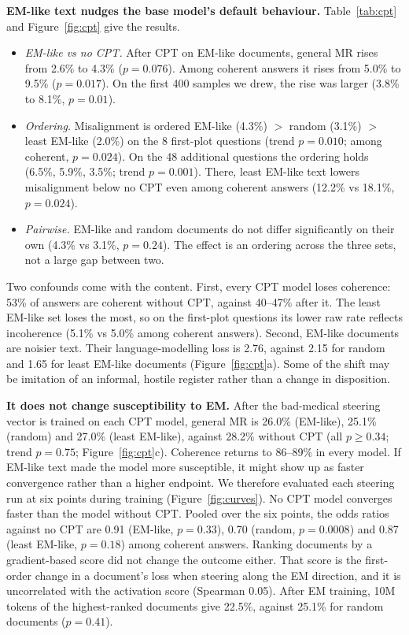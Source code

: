 \documentclass{article}
\begin{document}
\textbf{EM-like text nudges the base model's default behaviour.} Table~\ref{tab:cpt} and Figure~\ref{fig:cpt} give the
results.
\begin{itemize}[leftmargin=1.2em, itemsep=1pt]
  \item \emph{EM-like vs no CPT.} After CPT on EM-like documents, general MR rises from 2.6\% to 4.3\% ($p=0.076$). Among
  coherent answers it rises from 5.0\% to 9.5\% ($p=0.017$). On the first 400 samples we drew, the rise was larger (3.8\%
  to 8.1\%, $p=0.01$).
  \item \emph{Ordering.} Misalignment is ordered EM-like (4.3\%) $>$ random (3.1\%) $>$ least EM-like (2.0\%) on the 8
  first-plot questions (trend $p=0.010$; among coherent, $p=0.024$). On the 48 additional questions the ordering holds
  (6.5\%, 5.9\%, 3.5\%; trend $p=0.001$). There, least EM-like text lowers misalignment below no CPT even among coherent
  answers (12.2\% vs 18.1\%, $p=0.024$).
  \item \emph{Pairwise.} EM-like and random documents do not differ significantly on their own (4.3\% vs 3.1\%, $p=0.24$).
  The effect is an ordering across the three sets, not a large gap between two.
\end{itemize}
Two confounds come with the content. First, every CPT model loses coherence: 53\% of answers are coherent without CPT,
against 40--47\% after it. The least EM-like set loses the most, so on the first-plot questions its lower raw rate reflects
incoherence (5.1\% vs 5.0\% among coherent answers). Second, EM-like documents are noisier text. Their language-modelling
loss is 2.76, against 2.15 for random and 1.65 for least EM-like documents (Figure~\ref{fig:cpt}a). Some of the shift may
be imitation of an informal, hostile register rather than a change in disposition.

\textbf{It does not change susceptibility to EM.} After the bad-medical steering vector is trained on each CPT model,
general MR is 26.0\% (EM-like), 25.1\% (random) and 27.0\% (least EM-like), against 28.2\% without CPT (all $p\ge0.34$;
trend $p=0.75$; Figure~\ref{fig:cpt}c). Coherence returns to 86--89\% in every model. If EM-like text made the model more
susceptible, it might show up as faster convergence rather than a higher endpoint. We therefore evaluated each steering run
at six points during training (Figure~\ref{fig:curves}). No CPT model converges faster than the model without CPT. Pooled
over the six points, the odds ratios against no CPT are 0.91 (EM-like, $p=0.33$), 0.70 (random, $p=0.0008$) and 0.87
(least EM-like, $p=0.18$) among coherent answers. Ranking documents by a gradient-based score did not change the outcome
either. That score is the first-order change in a document's loss when steering along the EM direction, and it is
uncorrelated with the activation score (Spearman 0.05). After EM training, 10M tokens of the highest-ranked documents give
22.5\%, against 25.1\% for random documents ($p=0.41$).
\end{document}

